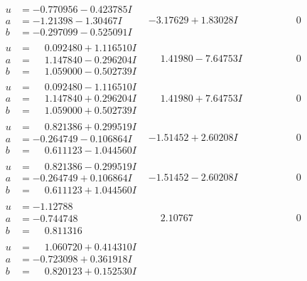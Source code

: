 \documentclass[1p]{elsarticle_modified}
\theoremstyle{definition}
\begin{document}
$$\begin{array}{c|c|c}
\begin{aligned}
u &= -0.770956 - 0.423785 I \\
a &= -1.21398 - 1.30467 I \\
b &= -0.297099 - 0.525091 I\end{aligned}
 & -3.17629 + 1.83028 I & \phantom{-0.000000 } 0 \\ \hline\begin{aligned}
u &= \phantom{-}0.092480 + 1.116510 I \\
a &= \phantom{-}1.147840 - 0.296204 I \\
b &= \phantom{-}1.059000 - 0.502739 I\end{aligned}
 & \phantom{-}1.41980 - 7.64753 I & \phantom{-0.000000 } 0 \\ \hline\begin{aligned}
u &= \phantom{-}0.092480 - 1.116510 I \\
a &= \phantom{-}1.147840 + 0.296204 I \\
b &= \phantom{-}1.059000 + 0.502739 I\end{aligned}
 & \phantom{-}1.41980 + 7.64753 I & \phantom{-0.000000 } 0 \\ \hline\begin{aligned}
u &= \phantom{-}0.821386 + 0.299519 I \\
a &= -0.264749 - 0.106864 I \\
b &= \phantom{-}0.611123 - 1.044560 I\end{aligned}
 & -1.51452 + 2.60208 I & \phantom{-0.000000 } 0 \\ \hline\begin{aligned}
u &= \phantom{-}0.821386 - 0.299519 I \\
a &= -0.264749 + 0.106864 I \\
b &= \phantom{-}0.611123 + 1.044560 I\end{aligned}
 & -1.51452 - 2.60208 I & \phantom{-0.000000 } 0 \\ \hline\begin{aligned}
u &= -1.12788\phantom{ +0.000000I} \\
a &= -0.744748\phantom{ +0.000000I} \\
b &= \phantom{-}0.811316\phantom{ +0.000000I}\end{aligned}
 & \phantom{-}2.10767\phantom{ +0.000000I} & \phantom{-0.000000 } 0 \\ \hline\begin{aligned}
u &= \phantom{-}1.060720 + 0.414310 I \\
a &= -0.723098 + 0.361918 I \\
b &= \phantom{-}0.820123 + 0.152530 I\end{aligned}

\end{array}$$
\end{document}

